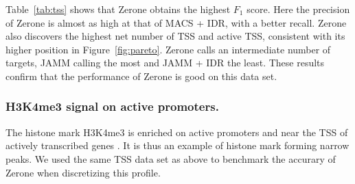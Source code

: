 \documentclass{bioinfo}
\begin{document}
Table~\ref{tab:tss} shows that Zerone obtains the highest $F_1$
score. Here the precision of Zerone is almost as high at that of MACS
+ IDR, with a better recall. Zerone also discovers the highest net
number of TSS and active TSS, consistent with its higher position
in Figure~\ref{fig:pareto}. Zerone calls an intermediate number of
targets, JAMM calling the most and JAMM + IDR the least.
These results confirm that the performance
of Zerone is good on this data set.

\subsubsection{H3K4me3 signal on active promoters.}
\label{subsub:h3k4me3}
The histone mark H3K4me3 is enriched on active promoters and
near the TSS of actively transcribed genes
\citep{pmid15680324,pmid17512414,pmid17277777}. It is thus an example
of histone mark forming narrow peaks. We used the same TSS data set
as above to benchmark the accurary of Zerone when discretizing
this profile.
\end{document}
